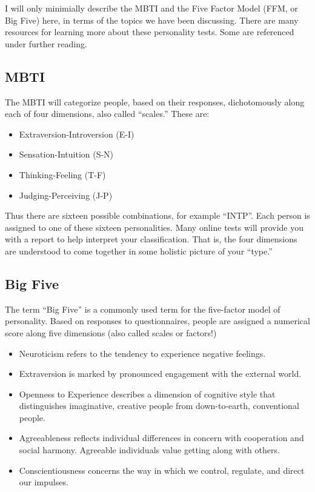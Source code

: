 \documentclass[openany]{book}
\providecommand{\tightlist}{%
  \setlength{\itemsep}{0pt}\setlength{\parskip}{0pt}}
\begin{document}
I will only minimially describe the MBTI and the Five Factor Model (FFM, or Big Five) here, in terms of the topics we have been discussing. There are many resources for learning more about these personality tests. Some are referenced under further reading.

\hypertarget{mbti}{%
\subsection*{MBTI}\label{mbti}}

The MBTI will categorize people, based on their responses, dichotomously along each of four dimensions, also called ``scales.'' These are:

\begin{itemize}
\tightlist
\item
  Extraversion-Introversion (E-I)
\item
  Sensation-Intuition (S-N)
\item
  Thinking-Feeling (T-F)
\item
  Judging-Perceiving (J-P)
\end{itemize}

Thus there are sixteen possible combinations, for example ``INTP''. Each person is assigned to one of these sixteen personalities. Many online tests will provide you with a report to help interpret your classification. That is, the four dimensions are understood to come together in some holistic picture of your ``type.''

\hypertarget{big-five}{%
\subsection*{Big Five}\label{big-five}}

The term ``Big Five'' is a commonly used term for the five-factor model of personality. Based on responses to questionnaires, people are assigned a numerical score along five dimensions (also called scales or factors!)

\begin{itemize}
\tightlist
\item
  Neuroticism refers to the tendency to experience negative feelings.
\item
  Extraversion is marked by pronounced engagement with the external world.
\item
  Openness to Experience describes a dimension of cognitive style that distinguishes imaginative, creative people from down-to-earth, conventional people.
\item
  Agreeableness reflects individual differences in concern with cooperation and social harmony. Agreeable individuals value getting along with others.
\item
  Conscientiousness concerns the way in which we control, regulate, and direct our impulses.
\end{itemize}
\end{document}
